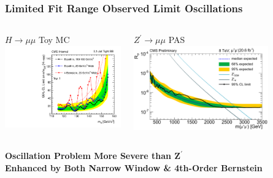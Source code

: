 \documentclass{beamer}
\begin{document}
\begin{frame}
\frametitle{Limited Fit Range Observed Limit Oscillations}
\begin{columns}[c]
 \column{55mm}
    \begin{center}
      $H\rightarrow\mu\mu$ Toy MC\\
      \includegraphics[width=50mm]{20GeVFitRange/compareLimits_TightBB_toy1.pdf}
    \end{center}
 \column{60mm}
    \begin{center}
      $Z^\prime\rightarrow\mu\mu$ PAS\\
      \includegraphics[width=58mm]{20GeVFitRange/zprime_Moriond13_muon.pdf}
    \end{center}
\end{columns}
\begin{center}
\bf
Oscillation Problem More Severe than $\bm{Z^\prime}$
\\
Enhanced by Both Narrow Window \& 4th-Order Bernstein
\end{center}
\end{frame}
\end{document}
